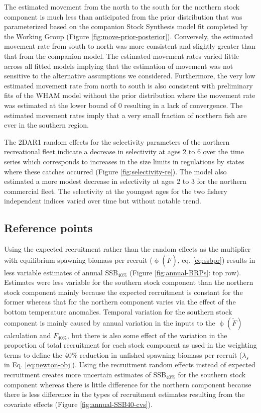 \documentclass[
]{article}
\begin{document}
The estimated movement from the north to the south for the northern
stock component is much less than anticipated from the prior
distribution that was parameterized based on the companion Stock
Synthesis model fit completed by the Working Group (Figure
\ref{fig:move-prior-posterior}). Conversely, the estimated movement rate
from south to north was more consistent and slightly greater than that
from the companion model. The estimated movement rates varied little
across all fitted models implying that the estimation of movement was
not sensitive to the alternative assumptions we considered. Furthermore,
the very low estimated movement rate from north to south is also
consistent with preliminary fits of the WHAM model without the prior
distribution where the movement rate was estimated at the lower bound of
0 resulting in a lack of convergence. The estimated movement rates imply
that a very small fraction of northern fish are ever in the southern
region.

The 2DAR1 random effects for the selectivity parameters of the northern
recreational fleet indicate a decrease in selectivity at ages 2 to 6
over the time series which corresponds to increases in the size limits
in regulations by states where these catches occurred (Figure
\ref{fig:selectivity-re}). The model also estimated a more modest
decrease in selectivity at ages 2 to 3 for the northern commercial
fleet. The selectivity at the youngest ages for the two fishery
independent indices varied over time but without notable trend.

\hypertarget{reference-points-1}{%
\subsection*{Reference points}\label{reference-points-1}}

Using the expected recruitment rather than the random effects as the
multiplier with equilibrium spawning biomass per recruit
(\(\upphi(\widetilde{F})\), eq. \ref{eq:ssbpr}) results in less variable
estimates of annual SSB\(_{40\%}\) (Figure \ref{fig:annual-BRPs}: top
row). Estimates were less variable for the southern stock component than
the northern stock component mainly because the expected recruitment is
constant for the former whereas that for the northern component varies
via the effect of the bottom temperature anomalies. Temporal variation
for the southern stock component is mainly caused by annual variation in
the inputs to the \(\upphi(\widetilde{F})\) calculation and
\(F_{40\%}\), but there is also some effect of the variation in the
proportion of total recruitment for each stock component as used in the
weighting terms to define the 40\% reduction in unfished spawning
biomass per recruit (\(\lambda_s\) in Eq. \ref{eq:newton-obj}). Using
the recruitment random effects instead of expected recruitment creates
more uncertain estimates of SSB\(_{40\%}\) for the southern stock
component whereas there is little difference for the northern component
because there is less difference in the types of recruitment estimates
resulting from the covariate effects (Figure
\ref{fig:annual-SSB40-cvs}).
\end{document}
